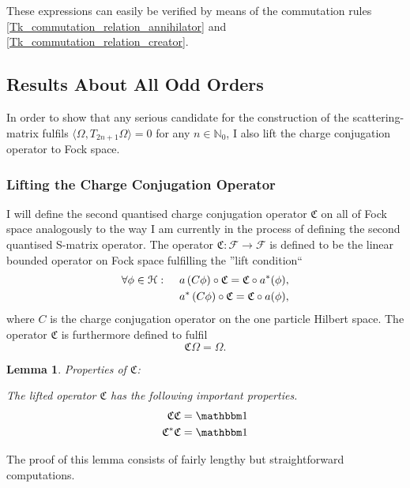 \documentclass[b5paper,draft,openbib,12pt]{memoir}
\newtheorem{lemma}{Lemma}
\newcommand{\id}{{\mathbbm 1}}
\begin{document}
These expressions can easily be verified by means of the commutation rules \eqref{Tk_commutation_relation_annihilator} and \eqref{Tk_commutation_relation_creator}.


\subsection{Results About All Odd Orders}\label{sec: odd orders}
In order to show that any serious candidate for the construction of the scattering-matrix fulfils \(\langle \Omega, T_{2n+1}\Omega \rangle =0\) for any \(n\in\mathbb{N}_0\), I also lift the charge conjugation operator to Fock space.
\subsubsection{ Lifting the Charge Conjugation Operator}


I will define the second quantised charge conjugation operator \(\mathfrak{C}\) on all of Fock space analogously to the way I am currently in the process of defining the second quantised S-matrix operator.
The operator \(\mathfrak{C}: \mathcal{F}\rightarrow \mathcal{F}\) is defined to be the linear bounded operator on Fock space fulfilling the ''lift condition``
\begin{equation}
\begin{aligned}
\forall \phi\in \mathcal{H}: \hspace{0.5cm} &a\left( C \phi \right)  \circ \mathfrak{C}=\mathfrak{C} \circ a^*(\phi),\\
\hspace{0.5cm} &a^*\left( C \phi \right)  \circ \mathfrak{C}=\mathfrak{C} \circ a(\phi),
\end{aligned}
\end{equation}
where \(C\) is the charge conjugation operator on the one particle Hilbert space. The operator \(\mathfrak{C}\) is furthermore defined to fulfil
\begin{equation}
\mathfrak{C}\Omega=\Omega.
\end{equation}

\begin{lemma}\label{basic_properties}
{\large Properties of} \(\mathfrak{C}\):

The lifted operator \(\mathfrak{C}\) has the following important properties.
\begin{align}
\mathfrak{C} \mathfrak{C} = \id \label{self_invers}\\
\mathfrak{C}^* \mathfrak{C} = \id \label{unitarity}
\end{align}
\end{lemma}
The proof of this lemma consists of fairly lengthy but straightforward computations.
\end{document}
